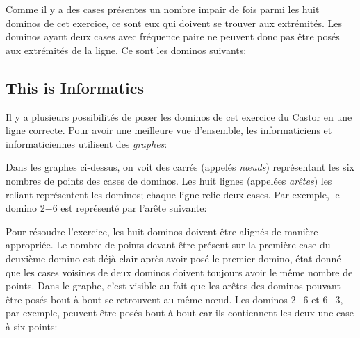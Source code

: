 \documentclass[a4paper,11pt]{report}
\newcommand{\taskGraphicsFolder}{..}
\begin{document}
{\centering%
\par}

Comme il y a des cases présentes un nombre impair de fois parmi les huit dominos de cet exercice, ce sont eux qui doivent se trouver aux extrémités. Les dominos ayant deux cases avec fréquence paire ne peuvent donc pas être posés aux extrémités de la ligne. Ce sont les dominos suivants:

{\centering%
\par}


\subsection*{This is Informatics}

Il y a plusieurs possibilités de poser les dominos de cet exercice du Castor en une ligne correcte. Pour avoir une meilleure vue d’ensemble, les informaticiens et informaticiennes utilisent des \emph{graphes}:

{\centering%
\par}

Dans les graphes ci-dessus, on voit des carrés (appelés \emph{nœuds}) représentant les six nombres de points des cases de dominos. Les huit lignes (appelées \emph{arêtes}) les reliant représentent les dominos; chaque ligne relie deux cases. Par exemple, le domino 2$-6$ est représenté par l’arête suivante:

{\centering%
\par}

Pour résoudre l’exercice, les huit dominos doivent être alignés de manière appropriée. Le nombre de points devant être présent sur la première case du deuxième domino est déjà clair après avoir posé le premier domino, état donné que les cases voisines de deux dominos doivent toujours avoir le même nombre de points. Dans le graphe, c’est visible au fait que les arêtes des dominos pouvant être posés bout à bout se retrouvent au même nœud. Les dominos 2$-6$ et 6$-3$, par exemple, peuvent être posés bout à bout car ils contiennent les deux une case à six points:

{\centering%
\par}
\end{document}
